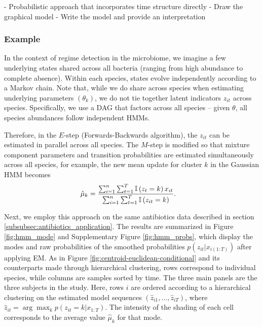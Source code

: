 \documentclass[14pt]{extreport}
\begin{document}
- Probabilistic approach that incorporates time structure directly
- Draw the graphical model
- Write the model and provide an interpretation

\subsubsection{Example}
\label{subsubsec:hmm_example}

In the context of regime detection in the microbiome, we imagine a few
underlying states shared across all bacteria (ranging from high abundance to
complete absence). Within each species, states evolve independently according to
a Markov chain. Note that, while we do share across species when estimating
underlying parameters $\left(\theta_{k}\right)$, we do not tie together latent
indicators $z_{it}$ across species. Specifically, we use a DAG that factors
across all species -- given $\theta$, all species abundances follow independent
HMMs.

Therefore, in the $E$-step (Forwards-Backwards algorithm), the $z_{it}$ can be
estimated in parallel across all species. The $M$-step is modified so that
mixture component parameters and transition probabilities are estimated
simultaneously across all species, for example, the new mean update for cluster
$k$ in the Gaussian HMM becomes
\begin{align*}
\hat{\mu}_{k} &= \frac{\sum_{i = 1}^{n}\sum_{t = 1}^{T} \mathbb{I}\left({z_{t} = k}\right)x_{it}}{\sum_{i = 1}^{n}\sum_{t = 1}^{T} \mathbb{I}\left({z_{it} = k}\right)}.
\end{align*}

Next, we employ this approach on the same antibiotics data described in section
\ref{subsubsec:antibiotics_application}. The results are summarized in Figure
\ref{fig:hmm_mode} and Supplementary Figure \ref{fig:hmm_probs}, which display
the modes and raw probabilities of the smoothed probabilities $p\left(z_{it}
\vert x_{i(1:T)}\right)$ after applying EM. As in Figure
\ref{fig:centroid-euclidean-conditional} and its counterparts made through
hierarchical clustering, rows correspond to individual species, while columns
are samples sorted by time. The three main panels are the three subjects in the
study. Here, rows $i$ are ordered according to a hierarchical clustering on the
estimated model sequences $\left(\hat{z}_{i1}, \dots, \hat{z}_{iT}\right)$,
where $\hat{z}_{it} = \arg \max_{k} p\left(z_{it} = k \vert x_{1:T}\right)$. The
intensity of the shading of each cell corresponds to the average value
$\hat{\mu}_{k}$ for that mode.
\end{document}

